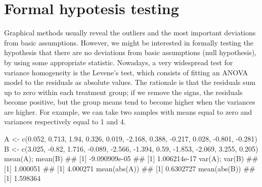 \documentclass[a4paper,12pt,oneside]{book}
\newenvironment{Shaded}{\begin{snugshade}}{\end{snugshade}}
\newcommand{\FloatTok}[1]{#1}
\newcommand{\SpecialCharTok}[1]{#1}
\newcommand{\DocumentationTok}[1]{#1}
\newcommand{\OtherTok}[1]{#1}
\newcommand{\FunctionTok}[1]{#1}
\newcommand{\NormalTok}[1]{#1}
\begin{document}
\hypertarget{formal-hypotesis-testing}{%
\section{Formal hypotesis testing}\label{formal-hypotesis-testing}}

Graphical methods usually reveal the outliers and the most important deviations from basic assumptions. However, we might be interested in formally testing the hypothesis that there are no deviations from basic assumptions (null hypothesis), by using some appropriate statistic. Nowadays, a very widespread test for variance homogeneity is the Levene's test, which consists of fitting an ANOVA model to the residuals as absolute values. The rationale is that the residuals sum up to zero within each treatment group; if we remove the signs, the residuals become positive, but the group means tend to become higher when the variances are higher. For example, we can take two samples with means equal to zero and variances respectively equal to 1 and 4.

\begin{Shaded}
\begin{Highlighting}[]
\NormalTok{A }\OtherTok{\textless{}{-}} \FunctionTok{c}\NormalTok{(}\FloatTok{0.052}\NormalTok{, }\FloatTok{0.713}\NormalTok{, }\FloatTok{1.94}\NormalTok{, }\FloatTok{0.326}\NormalTok{, }\FloatTok{0.019}\NormalTok{, }\SpecialCharTok{{-}}\FloatTok{2.168}\NormalTok{, }\FloatTok{0.388}\NormalTok{,}
       \SpecialCharTok{{-}}\FloatTok{0.217}\NormalTok{, }\FloatTok{0.028}\NormalTok{, }\SpecialCharTok{{-}}\FloatTok{0.801}\NormalTok{, }\SpecialCharTok{{-}}\FloatTok{0.281}\NormalTok{)}
\NormalTok{B }\OtherTok{\textless{}{-}} \FunctionTok{c}\NormalTok{(}\FloatTok{3.025}\NormalTok{, }\SpecialCharTok{{-}}\FloatTok{0.82}\NormalTok{, }\FloatTok{1.716}\NormalTok{, }\SpecialCharTok{{-}}\FloatTok{0.089}\NormalTok{, }\SpecialCharTok{{-}}\FloatTok{2.566}\NormalTok{, }\SpecialCharTok{{-}}\FloatTok{1.394}\NormalTok{,}
       \FloatTok{0.59}\NormalTok{, }\SpecialCharTok{{-}}\FloatTok{1.853}\NormalTok{, }\SpecialCharTok{{-}}\FloatTok{2.069}\NormalTok{, }\FloatTok{3.255}\NormalTok{, }\FloatTok{0.205}\NormalTok{)}
\FunctionTok{mean}\NormalTok{(A); }\FunctionTok{mean}\NormalTok{(B)}
\DocumentationTok{\#\# [1] {-}9.090909e{-}05}
\DocumentationTok{\#\# [1] 1.006214e{-}17}
\FunctionTok{var}\NormalTok{(A); }\FunctionTok{var}\NormalTok{(B)}
\DocumentationTok{\#\# [1] 1.000051}
\DocumentationTok{\#\# [1] 4.000271}
\FunctionTok{mean}\NormalTok{(}\FunctionTok{abs}\NormalTok{(A))}
\DocumentationTok{\#\# [1] 0.6302727}
\FunctionTok{mean}\NormalTok{(}\FunctionTok{abs}\NormalTok{(B))}
\DocumentationTok{\#\# [1] 1.598364}
\end{Highlighting}
\end{Shaded}
\end{document}
